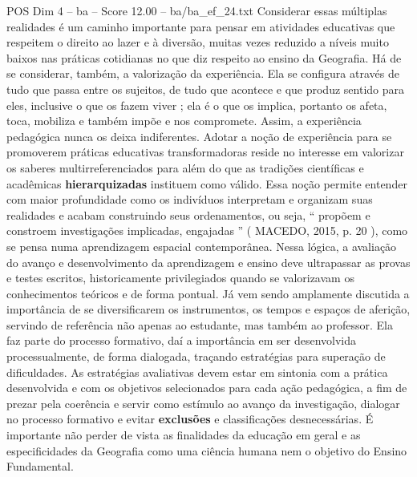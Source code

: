 \begin{textsample}{POS Dim 4 – ba – Score 12.00 – ba/ba\_ef\_24.txt}
Considerar essas múltiplas realidades é um caminho importante para pensar em atividades educativas que respeitem o direito ao lazer e à diversão, muitas vezes reduzido a níveis muito baixos nas práticas cotidianas no que diz respeito ao ensino da Geografia.
Há de se considerar, também, a valorização da experiência.
Ela se configura através de tudo que passa entre os sujeitos, de tudo que acontece e que produz sentido para eles, inclusive o que os fazem viver ; ela é o que os implica, portanto os afeta, toca, mobiliza e também impõe e nos compromete.
Assim, a experiência pedagógica nunca os deixa indiferentes.
Adotar a noção de experiência para se promoverem práticas educativas transformadoras reside no interesse em valorizar os saberes multirreferenciados para além do que as tradições científicas e acadêmicas \textbf{hierarquizadas} instituem como válido.
Essa noção permite entender com maior profundidade como os indivíduos interpretam e organizam suas realidades e acabam construindo seus ordenamentos, ou seja, “ propõem e constroem investigações implicadas, engajadas ” ( MACEDO, 2015, p. 20 ), como se pensa numa aprendizagem espacial contemporânea.
Nessa lógica, a avaliação do avanço e desenvolvimento da aprendizagem e ensino deve ultrapassar as provas e testes escritos, historicamente privilegiados quando se valorizavam os conhecimentos teóricos e de forma pontual.
Já vem sendo amplamente discutida a importância de se diversificarem os instrumentos, os tempos e espaços de aferição, servindo de referência não apenas ao estudante, mas também ao professor.
Ela faz parte do processo formativo, daí a importância em ser desenvolvida processualmente, de forma dialogada, traçando estratégias para superação de dificuldades.
As estratégias avaliativas devem estar em sintonia com a prática desenvolvida e com os objetivos selecionados para cada ação pedagógica, a fim de prezar pela coerência e servir como estímulo ao avanço da investigação, dialogar no processo formativo e evitar \textbf{exclusões} e classificações desnecessárias.
É importante não perder de vista as finalidades da educação em geral e as especificidades da Geografia como uma ciência humana nem o objetivo do Ensino Fundamental.

\end{textsample}
